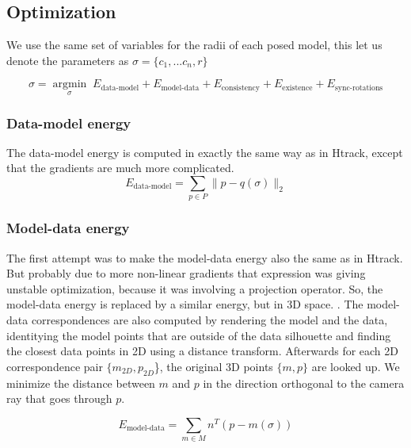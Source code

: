 \subsection{Optimization}

We use the same set of variables for the radii of each posed model, this let us denote the parameters as $\sigma = \{c_1, ... c_n, r\}$ 

\vspace{-5mm}

\begin{equation*}
\sigma =\underset{\sigma}{\operatorname{argmin}} \; E_\text{data-model} + E_\text{model-data} + E_\text{consistency} + E_\text{existence} + E_\text{sync-rotations}
\end{equation*}

\subsubsection{Data-model energy}
The data-model energy is computed in exactly the same way as in Htrack, except that the gradients are much more complicated.
\begin{equation*}
E_\text{data-model} = \underset{p\in P}\sum \| p - q(\sigma)\|_2
\end{equation*}

\subsubsection{Model-data energy}
The first attempt was to make the model-data energy also the same as in Htrack. But probably due to more non-linear gradients that expression was giving unstable optimization, because it was involving a projection operator. So, the model-data energy is replaced by a similar energy, but in 3D space. .
The model-data correspondences are also computed by rendering the model and the data, identitying the model points that are outside of the data silhouette and finding the closest data points in 2D using a distance transform. Afterwards for each 2D correspondence pair $\{m_{2D}, p_{2D}$\}, the original 3D points $\{m, p\}$ are looked up. We minimize the distance between $m$ and $p$ in the direction orthogonal to the camera ray that goes through $p$.


\begin{equation*}
E_\text{model-data} = \underset{m\in M}\sum n^T(p - m(\sigma))
\end{equation*}

